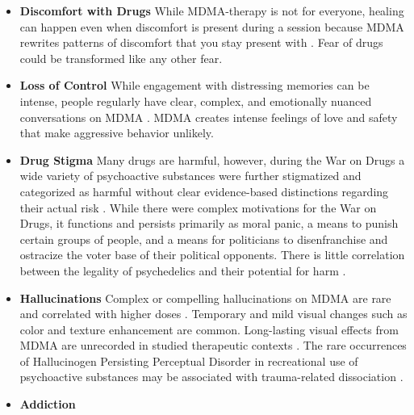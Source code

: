 \documentclass[12pt,letterpaper]{article}
\begin{document}
\begin{itemize}
    \item \textbf{Discomfort with Drugs}
     While MDMA-therapy is not for everyone, healing can happen even when discomfort is present during a session because MDMA rewrites patterns of discomfort that you stay present with \cite{fedduciaMDMAMemoryReconsolidation}. Fear of drugs could be transformed like any other fear.
    \item \textbf{Loss of Control}    
        While engagement with distressing memories can be intense, people regularly have clear, complex, and emotionally nuanced conversations on MDMA \cite{colbertEvenings,passieHistory}. MDMA creates intense feelings of love and safety that make aggressive behavior unlikely.
    \item \textbf{Drug Stigma}
        Many drugs are harmful, however, during the War on Drugs a wide variety of psychoactive substances were further stigmatized and categorized as harmful without clear evidence-based distinctions regarding their actual risk \cite{alexanderNewJimCrow,nuttDrugHarms}. While there were complex motivations for the War on Drugs, it functions and persists primarily as moral panic, a means to punish certain groups of people, and a means for politicians to disenfranchise and ostracize the voter base of their political opponents. There is little correlation between the legality of psychedelics and their potential for harm \cite{nuttDrugHarms}.
    \item \textbf{Hallucinations}
        Complex or compelling hallucinations on MDMA are rare and correlated with higher doses \cite{liechtiGender}. Temporary and mild visual changes such as color and texture enhancement are common. Long-lasting visual effects from MDMA are unrecorded in studied therapeutic contexts \cite{vizeliActuteEffects}. The rare occurrences of Hallucinogen Persisting Perceptual Disorder in recreational use of psychoactive substances may be associated with trauma-related dissociation \cite{halpernHPPD}.
    \item \textbf{Addiction}

\end{itemize}
\end{document}
